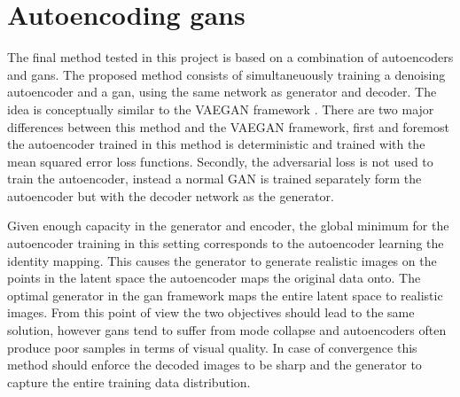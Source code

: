 \section{Autoencoding \acrshort{gans}}
The final method tested in this project is based on a combination of autoencoders and \acrshort{gans}. The proposed method consists of simultaneuously training a denoising autoencoder and a \acrshort{gan}, using the same network as generator and decoder. The idea is conceptually similar to the VAEGAN framework \parencite{LarsenSW15autoencodingbeyond}. There are two major differences between this method and the VAEGAN framework, first and foremost the autoencoder trained in this method is deterministic and trained with the mean squared error loss functions. Secondly, the adversarial loss is not used to train the autoencoder, instead a normal GAN is trained separately form the autoencoder but with the decoder network as the generator. 

Given enough capacity in the generator and encoder, the global minimum for the autoencoder training in this setting corresponds to the autoencoder learning the identity mapping. This causes the generator to generate realistic images on the points in the latent space the autoencoder maps the original data onto. The optimal generator in the \acrshort{gan} framework maps the entire latent space to realistic images. From this point of view the two objectives should lead to the same solution, however \acrshort{gans} tend to suffer from mode collapse and autoencoders often produce poor samples in terms of visual quality. In case of convergence this method should enforce the decoded images to be sharp and the generator to capture the entire training data distribution.


